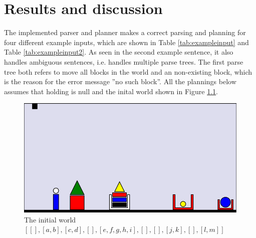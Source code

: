 \chapter{Results and discussion}
The implemented parser and planner makes a correct parsing and planning for four different example inputs, which are shown in Table \ref{tab:exampleinput} and Table \ref{tab:exampleinput2}. As seen in the second example sentence, it also handles ambiguous sentences, i.e. handles multiple parse trees. The first parse tree both refers to move all blocks in the world and an non-existing block, which is the reason for the error message ''no such block''. All the plannings below assumes that holding is null and the inital world shown in Figure \ref{fig:initworld}.\\
\begin{figure}[h!]
\centering
\includegraphics[scale = 0.4]{fig/1.png}
\caption{The initial world\\ $[[],[a,b],[c,d], [], [e,f,g,h,i],[],[],[j,k], [], [l,m]]$}
\label{fig:initworld}
\end{figure}\\
